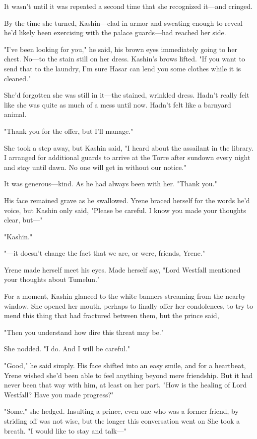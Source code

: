 It wasn't until it was repeated a second time that she recognized it---and cringed.

By the time she turned, Kashin---clad in armor and sweating enough to reveal he'd likely been exercising with the palace guards---had reached her side.

"I've been looking for you," he said, his brown eyes immediately going to her chest. No---to the stain still on her dress. Kashin's brows lifted. "If you want to send that to the laundry, I'm sure Hasar can lend you some clothes while it is cleaned."

She'd forgotten she was still in it---the stained, wrinkled dress. Hadn't really felt like she was quite as much of a mess until now. Hadn't felt like a barnyard animal.

"Thank you for the offer, but I'll manage."

She took a step away, but Kashin said, "I heard about the assailant in the library. I arranged for additional guards to arrive at the Torre after sundown every night and stay until dawn. No one will get in without our notice."

It was generous---kind. As he had always been with her. "Thank you."

His face remained grave as he swallowed. Yrene braced herself for the words he'd voice, but Kashin only said, "Please be careful. I know you made your thoughts clear, but---"

"Kashin."

"---it doesn't change the fact that we are, or were, friends, Yrene."

Yrene made herself meet his eyes. Made herself say, "Lord Westfall mentioned your  thoughts about Tumelun."

For a moment, Kashin glanced to the white banners streaming from the nearby window. She opened her mouth, perhaps to finally offer her condolences, to try to mend this thing that had fractured between them, but the prince said,

"Then you understand how dire this threat may be."

She nodded. "I do. And I will be careful."

"Good," he said simply. His face shifted into an easy smile, and for a heartbeat, Yrene wished she'd been able to feel anything beyond mere friendship. But it had never been that way with him, at least on her part. "How is the healing of Lord Westfall? Have you made progress?"

"Some," she hedged. Insulting a prince, even one who was a former friend, by striding off was not wise, but the longer this conversation went on  She took a breath. "I would like to stay and talk---"

